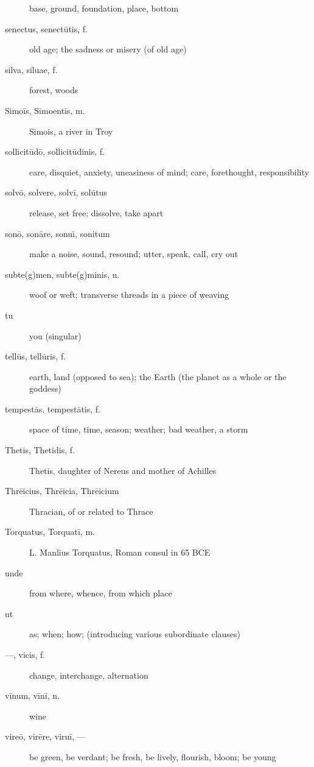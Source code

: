 \begin{description}
        base, ground, foundation, place, bottom
    \item[senectus, senectūtis, f.] old age; the sadness or misery (of old age)
    \item[silva, siluae, f.] forest, woods
    \item[Simoīs, Simoentis, m.] Simois, a river in Troy
    \item[sollicitūdō, sollicitūdinis, f.] care, disquiet, anxiety, uneasiness
        of mind; care, forethought, responsibility
    \item[solvō, solvere, solvī, solūtus] release, set free; dissolve, take
        apart
    \item[sonō, sonāre, sonuī, sonitum] make a noise, sound, resound; utter,
        speak, call, cry out
    \item[subte(g)men, subte(g)minis, n.] woof or weft; transverse threads in
        a piece of weaving
    \item[tu] you (singular)
    \item[tellūs, tellūris, f.] earth, land (opposed to sea); the Earth (the
        planet as a whole or the goddess)
    \item[tempestās, tempestātis, f.] space of time, time, season; weather; bad
        weather, a storm
    \item[Thetis, Thetidis, f.] Thetis, daughter of Nereus and mother of
        Achilles
    \item[Thrēicius, Thrēicia, Thrēicium] Thracian, of or related to Thrace
    \item[Torquatus, Torquatī, m.] L. Manlius Torquatus, Roman consul in 65 BCE
    \item[unde] from where, whence, from which place
    \item[ut] as; when; how; (introducing various subordinate clauses)
    \item[---, vicis, f.] change, interchange, alternation
    \item[vīnum, vīnī, n.] wine
    \item[vireō, virēre, viruī, ---] be green, be verdant; be fresh, be lively,
        flourish, bloom; be young
\end{description}
